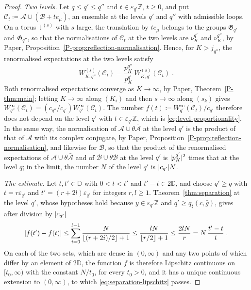 \documentclass[11pt]{preprint}
\DeclarePairedDelimiter{\abs}{\lvert}{\rvert}
\numberwithin{equation}{section}
\theoremstyle{definition}
\theoremstyle{remark}
\theoremstyle{plain}
\begin{document}
\begin{proof}
\emph{Two levels.} Let $q \leq q' \leq q''$ and $t \in \varepsilon_{q'}\mathbb Z$, $t \geq 0$, and put $\mathcal C_t \coloneqq \mathcal A \cup (\mathcal B + te_\mu)$, an ensemble at the levels $q'$ and $q''$ with admissible loops. On a torus $\mathbb T^{(s)}$ with $s$ large, the translation by $te_\mu$ belongs to the groups $\mathfrak G_{q'}$ and $\mathfrak G_{q''}$, so that the normalisations of $\mathcal C_t$ at the two levels are $\nu^{q'}_K$ and $\nu^{q''}_K$, by Paper, Proposition~\ref{P-prop:reflection-normalisation}. Hence, for $K > j_{q''}$, the renormalised expectations at the two levels satisfy
\begin{equation}\label{eq:two-levels}
    W^{(s)}_{K,q''}(\mathcal C_t) = \frac{p^{q''}_K}{p^{q'}_K}\,W^{(s)}_{K,q'}(\mathcal C_t)\;.
\end{equation}
Both renormalised expectations converge as $K \to \infty$, by Paper, Theorem~\ref{P-thm:main}; letting $K \to \infty$ along $(K_i)$ and then $s \to \infty$ along $(s_k)$ gives $W^\infty_{q''}(\mathcal C_t) = (c_{q''}/c_{q'})W^\infty_{q'}(\mathcal C_t)$. The number $f(t) \coloneqq W^\infty_{q'}(\mathcal C_t)/c_{q'}$ therefore does not depend on the level $q'$ with $t \in \varepsilon_{q'}\mathbb Z$, which is \eqref{eq:level-proportionality}. In the same way, the normalisation of $\mathcal A \cup \theta\bar{\mathcal A}$ at the level $q'$ is the product of that of $\mathcal A$ with its complex conjugate, by Paper, Proposition~\ref{P-prop:reflection-normalisation}, and likewise for $\mathcal B$, so that the product of the renormalised expectations of $\mathcal A \cup \theta\bar{\mathcal A}$ and of $\mathcal B \cup \theta\bar{\mathcal B}$ at the level $q'$ is $\abs{p^{q'}_K}^2$ times that at the level $q$; in the limit, the number $N$ of the level $q'$ is $\abs{c_{q'}}N$.

\emph{The estimate.} Let $t, t' \in \mathbb D$ with $0 < t < t'$ and $t' - t \in 2\mathbb D$, and choose $q' \geq q$ with $t = r\varepsilon_{q'}$ and $t' = (r + 2l)\varepsilon_{q'}$ for integers $r, l \geq 1$. Theorem~\ref{thm:separation} at the level $q'$, whose hypotheses hold because $y \in \varepsilon_{q'}\mathbb Z$ and $q' \geq q_\sharp(c, \bar g)$, gives after division by $\abs{c_{q'}}$
\begin{equation}\label{eq:lipschitz-sum}
    \abs{f(t') - f(t)} \leq \sum_{i=0}^{l-1}\frac{N}{\lfloor(r + 2i)/2\rfloor + 1} \leq \frac{lN}{\lfloor r/2\rfloor + 1} \leq \frac{2lN}{r} = N\,\frac{t' - t}{t}\;.
\end{equation}
On each of the two sets, which are dense in $(0, \infty)$ and any two points of which differ by an element of $2\mathbb D$, the function $f$ is therefore Lipschitz continuous on $[t_0, \infty)$ with the constant $N/t_0$, for every $t_0 > 0$, and it has a unique continuous extension to $(0, \infty)$, to which \eqref{eq:separation-lipschitz} passes.
\end{proof}
\end{document}
